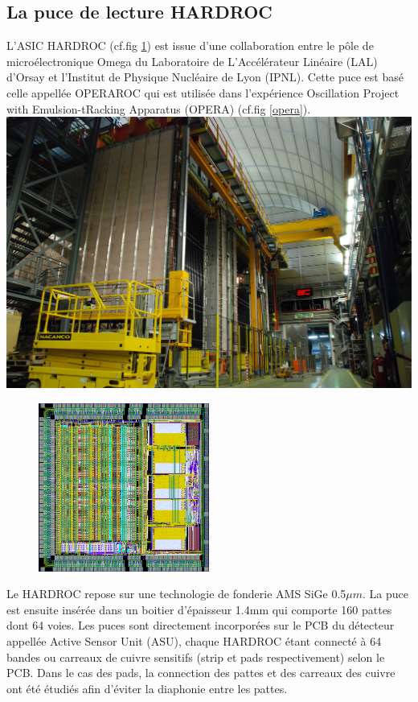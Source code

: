\subsection{La puce de lecture HARDROC}
L'ASIC HARDROC (cf.fig \ref{hardroc}) est issue d'une collaboration entre le pôle de microélectronique Omega du Laboratoire de L'Accélérateur Linéaire (LAL) d'Orsay et l'Institut de Physique Nucléaire de Lyon (IPNL). Cette puce est basé celle appellée OPERAROC qui est utilisée dans l'expérience Oscillation Project with Emulsion-tRacking Apparatus (OPERA) (cf.fig \ref{opera}).
\marginpar
{
	\centering
	\includegraphics[width=\marginparwidth]{GLA/OPERA.jpg}
	\label{opera}
}
\begin{figure}[ht!]
	\centering
	\includegraphics[width=0.5\textwidth]{GLA/HARDROC.png}
	\label{hardroc}
\end{figure}
Le HARDROC repose sur une technologie de fonderie AMS SiGe 0.5$\mu m$. La puce est ensuite insérée dans un boitier d'épaisseur 1.4mm qui comporte 160 pattes dont 64 voies. Les puces sont directement incorporées sur le PCB du détecteur appellée Active Sensor Unit (ASU), chaque HARDROC étant connecté à 64 bandes ou carreaux de cuivre sensitifs (strip et pads respectivement) selon le PCB. Dans le cas des pads, la connection des pattes et des carreaux des cuivre ont été étudiés afin d'éviter la diaphonie entre les pattes.
